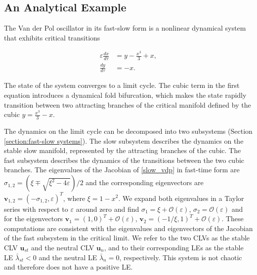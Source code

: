 \documentclass[aps,reprint,prx]{revtex4-2}
\begin{document}
\subsection{An Analytical Example} \label{subsection: vanderpol}

The Van der Pol oscillator in its fast-slow form is a nonlinear dynamical system that exhibits critical transitions \cite{kuehnMathematicalFrameworkCritical2011, kuehnMultipleTimeScale2015}

\begin{equation} \label{slow_vdp}
\begin{aligned} 
\varepsilon \frac{dx}{d\tau} &= y - \frac{x^3}{3} + x, \\
\frac{dy}{d\tau} &= -x.
\end{aligned}
\end{equation}


The state of the system converges to a limit cycle.
The cubic term in the first equation introduces a dynamical fold bifurcation, which makes the state rapidly transition between two attracting branches of the critical manifold defined by the cubic $y = \frac{x^3}{3} - x$. 

The dynamics on the limit cycle can be decomposed into two subsystems (Section \ref{section:fast-slow systems}). The slow subsystem describes the dynamics on the stable slow {manifold}, represented by the attracting branches of the cubic. The fast subsystem describes the dynamics of the transitions between the two cubic branches. 
The eigenvalues of the Jacobian of \eqref{slow_vdp} in fast-time form are $\sigma_{1,2} = \left( \xi \mp \sqrt{\xi^2 - 4\varepsilon} \right)/2$ and the corresponding eigenvectors are $\mathbf{v}_{1,2} = \left( -\sigma_{1,2}, \varepsilon \right)^T$, where $\xi = 1-x^2$. 
%
We expand both eigenvalues in a Taylor series with respect to $\varepsilon$ around zero and find $\sigma_1 =\xi + \mathcal{O}(\varepsilon)$, $\sigma_2 = \mathcal{O}(\varepsilon)$ and for the eigenvectors $\mathbf{v}_1 = \left(1, 0 \right)^T + \mathcal{O}(\varepsilon)$, $\mathbf{v}_2 = \left(-1/\xi, 1 \right)^T + \mathcal{O}(\varepsilon)$. These computations are consistent with the eigenvalues and eigenvectors of the Jacobian of the fast subsystem in the critical limit. {We refer to the two CLVs as the stable CLV $\mathbf{u}_{st}$ and the neutral CLV $\mathbf{u}_n$, and to their corresponding LEs as the stable LE $\bar{\lambda}_{st} < 0$ and the neutral LE $\bar{\lambda}_n = 0$, respectively. This system is not chaotic and therefore does not have a positive LE.}
\end{document}
